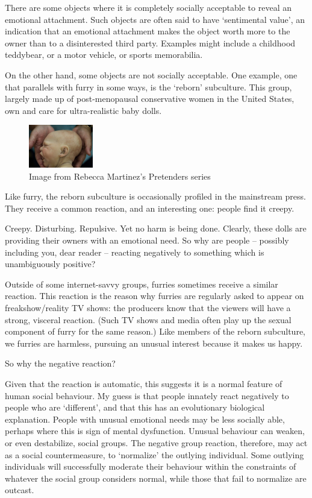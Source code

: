 There are some objects where it is completely socially acceptable to reveal an emotional attachment. Such objects are often said to have `sentimental value', an indication that an emotional attachment makes the object worth more to the owner than to a disinterested third party. Examples might include a childhood teddybear, or a motor vehicle, or sports memorabilia.

On the other hand, some objects are not socially acceptable. One example, one that parallels with furry in some ways, is the `reborn' subculture. This group, largely made up of post-menopausal conservative women in the United States, own and care for ultra-realistic baby dolls.

\begin{figure}
  \begin{center}
    \includegraphics[width=0.25\textwidth]{content/assets/inanimate-object--pretenders}
  \end{center}
  \caption{Image from Rebecca Martinez's Pretenders series}
\end{figure}

Like furry, the reborn subculture is occasionally profiled in the mainstream press. They receive a common reaction, and an interesting one: people find it creepy.

Creepy. Disturbing. Repulsive. Yet no harm is being done. Clearly, these dolls are providing their owners with an emotional need. So why are people -- possibly including you, dear reader -- reacting negatively to something which is unambiguously positive?

Outside of some internet-savvy groups, furries sometimes receive a similar reaction. This reaction is the reason why furries are regularly asked to appear on freakshow/reality TV shows: the producers know that the viewers will have a strong, visceral reaction. (Such TV shows and media often play up the sexual component of furry for the same reason.) Like members of the reborn subculture, we furries are harmless, pursuing an unusual interest because it makes us happy.

So why the negative reaction?

Given that the reaction is automatic, this suggests it is a normal feature of human social behaviour. My guess is that people innately react negatively to people who are `different', and that this has an evolutionary biological explanation. People with unusual emotional needs may be less socially able, perhaps where this is sign of mental dysfunction. Unusual behaviour can weaken, or even destabilize, social groups. The negative group reaction, therefore, may act as a social countermeasure, to `normalize' the outlying individual. Some outlying individuals will successfully moderate their behaviour within the constraints of whatever the social group considers normal, while those that fail to normalize are outcast.

